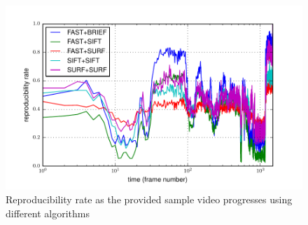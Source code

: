 \documentclass[11pt]{article} %
\theoremstyle{plain}
\theoremstyle{definition}
\theoremstyle{remark}
\numberwithin{equation}{section} %
\numberwithin{figure}{section} %
\numberwithin{table}{section} %
\begin{document}
\begin{figure}[H]
  \centering
  \caption{Reproducibility rate as the provided sample video progresses using different algorithms}
  \includegraphics{../figures/reproducibility.pdf}
\end{figure}




\end{document}
